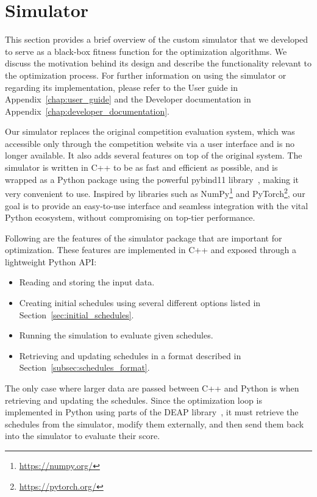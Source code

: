 \section{Simulator} \label{sec:simulator}

This section provides a brief overview of the custom simulator that we developed to serve as a black-box fitness function for the optimization algorithms. We discuss the motivation behind its design and describe the functionality relevant to the optimization process.
For further information on using the simulator or regarding its implementation, please refer to the User guide in Appendix~\ref{chap:user_guide} and the Developer documentation in Appendix~\ref{chap:developer_documentation}.

\medskip

Our simulator replaces the original competition evaluation system, which was accessible only through the competition website via a user interface and is no longer available. It also adds several features on top of the original system.
The simulator is written in C++ to be as fast and efficient as possible, and is wrapped as a Python package using the powerful pybind11 library~\cite{jakob2017pybind11}, making it very convenient to use.
Inspired by libraries such as NumPy\footnote{\url{https://numpy.org/}} and PyTorch\footnote{\url{https://pytorch.org/}}, our goal is to provide an easy-to-use interface and seamless integration with the vital Python ecosystem, without compromising on top-tier performance.

Following are the features of the simulator package that are important for optimization. These features are implemented in C++ and exposed through a lightweight Python API:
\begin{itemize}
    \item Reading and storing the input data.
    \item Creating initial schedules using several different options listed in Section~\ref{sec:initial_schedules}.
    \item Running the simulation to evaluate given schedules.
    \item Retrieving and updating schedules in a format described in Section~\ref{subsec:schedules_format}.
\end{itemize}

The only case where larger data are passed between C++ and Python is when retrieving and updating the schedules.
Since the optimization loop is implemented in Python using parts of the DEAP library~\cite{fortin2012deap}, it must retrieve the schedules from the simulator, modify them externally, and then send them back into the simulator to evaluate their score.

